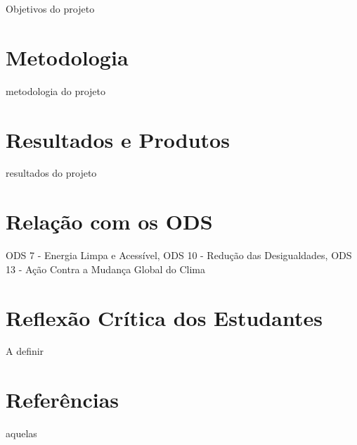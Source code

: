 \documentclass[12pt,a4paper]{article}
\begin{document}
Objetivos do projeto


\section*{Metodologia}

metodologia do projeto


\section*{Resultados e Produtos}

resultados do projeto


\section*{Relação com os ODS}

ODS 7 - Energia Limpa e Acessível, ODS 10 - Redução das Desigualdades, ODS 13 - Ação Contra a Mudança Global do Clima


\section*{Reflexão Crítica dos Estudantes}

A definir


\section*{Referências}

aquelas
\end{document}
